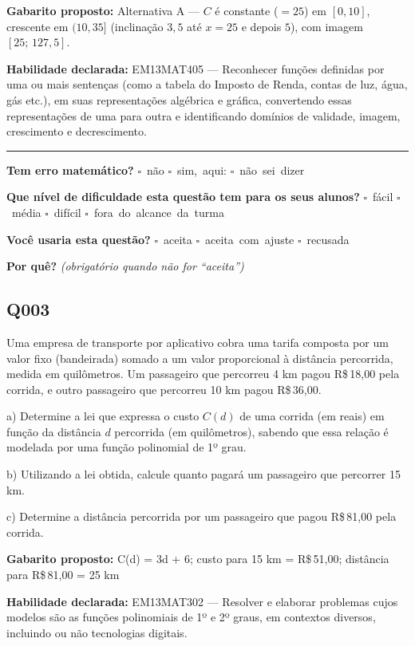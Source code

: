 \documentclass[11pt,a4paper]{article}
\begin{document}
\begin{samepage}
\textbf{Gabarito proposto:} Alternativa A — $C$ é constante ($=25$) em $[0,10]$, crescente em $(10,35]$ (inclinação $3{,}5$ até $x=25$ e depois $5$), com imagem $[25;\,127{,}5]$.

\textbf{Habilidade declarada:} EM13MAT405 --- Reconhecer funções definidas por uma ou mais sentenças (como a tabela do Imposto de Renda, contas de luz, água, gás etc.), em suas representações algébrica e gráfica, convertendo essas representações de uma para outra e identificando domínios de validade, imagem, crescimento e decrescimento.
\end{samepage}

\noindent\rule{\linewidth}{0.4pt}
\textbf{Tem erro matemático?}\quad
\mbox{$\square$~não} \quad \mbox{$\square$~sim, aqui:} \underline{\hspace{5cm}}
\quad \mbox{$\square$~não sei dizer}

\textbf{Que nível de dificuldade esta questão tem para os seus alunos?}\quad
\mbox{$\square$~fácil} \quad \mbox{$\square$~média} \quad
\mbox{$\square$~difícil} \quad \mbox{$\square$~fora do alcance da turma}

\textbf{Você usaria esta questão?}\quad
\mbox{$\square$~aceita} \quad \mbox{$\square$~aceita com ajuste} \quad
\mbox{$\square$~recusada}

\textbf{Por quê?} \emph{(obrigatório quando não for ``aceita'')}

\underline{\hspace{\linewidth}}

\underline{\hspace{\linewidth}}
\vspace{0.6em}

\begin{samepage}
\subsection*{Q003}
Uma empresa de transporte por aplicativo cobra uma tarifa composta por um valor fixo (bandeirada) somado a um valor proporcional à distância percorrida, medida em quilômetros. Um passageiro que percorreu 4 km pagou R\$\,18,00 pela corrida, e outro passageiro que percorreu 10 km pagou R\$\,36,00.

a) Determine a lei que expressa o custo $C(d)$ de uma corrida (em reais) em função da distância $d$ percorrida (em quilômetros), sabendo que essa relação é modelada por uma função polinomial de 1º grau.

b) Utilizando a lei obtida, calcule quanto pagará um passageiro que percorrer 15 km.

c) Determine a distância percorrida por um passageiro que pagou R\$\,81,00 pela corrida.

\textbf{Gabarito proposto:} C(d) = 3d + 6; custo para 15 km = R\$\,51,00; distância para R\$\,81,00 = 25 km

\textbf{Habilidade declarada:} EM13MAT302 --- Resolver e elaborar problemas cujos modelos são as funções polinomiais de 1º e 2º graus, em contextos diversos, incluindo ou não tecnologias digitais.
\end{samepage}
\end{document}

